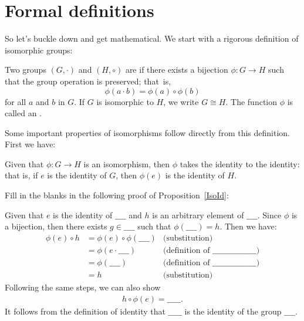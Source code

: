 \section{Formal definitions}
So let's buckle down and get mathematical. We start with a rigorous definition of isomorphic groups:

\begin{defn}\label{isomorph_defn}
Two groups $(G, \cdot)$ and $(H, \circ)$ are  if there exists a bijection $\phi : G \rightarrow H$ such that the group operation is preserved;  that~is, 
\[
\phi( a \cdot b) = \phi( a) \circ \phi( b)
\]
for all $a$ and $b$ in $G$. If $G$ is isomorphic to $H$, we write $G \cong H$\label{noteisomorph}. The function $\phi$ is called an . 
\end{defn}

Some important properties of isomorphisms follow directly from this definition. First we have:

\begin{thm}\label{IsoId}
Given that  $\phi : G \rightarrow H$ is an  isomorphism, then $\phi$ takes the identity to the identity: that is, if $e$ is the identity of $G$, then  $\phi(e)$ is the identity of $H$.
\end{thm}

\begin{exercise}
Fill in the blanks in the following proof of Proposition~\ref{IsoId}:
\medskip

\noindent
Given that $e$ is the identity of $ \_\_\_\_$ and $h$ is an arbitrary element of $\_\_\_\_$.  Since $\phi$ is a bijection, then there exists $g \in \_\_\_\_$ such that $\phi(\_\_\_\_) = h$.  Then  we have:
\begin{align*}
\phi(e) \circ h &= \phi(e) \circ \phi(\_\_\_\_) & \textrm{(substitution)}\\
&= \phi( e \cdot \_\_\_\_) & \textrm{(definition of \_\_\_\_\_\_\_\_\_\_\_\_\_\_\_\_)}\\
&= \phi( \_\_\_\_) & \textrm{(definition of \_\_\_\_\_\_\_\_\_\_\_\_\_\_\_\_)}\\
&= h & \textrm{(substitution)}
\end{align*}
Following the same steps, we can also show
\begin{align*}
h \circ \phi(e) = \_\_\_\_\_.
\end{align*}
It follows from the definition of identity that $\_\_\_\_\_$ is the identity of the group $\_\_\_\_$.
\end{exercise}


